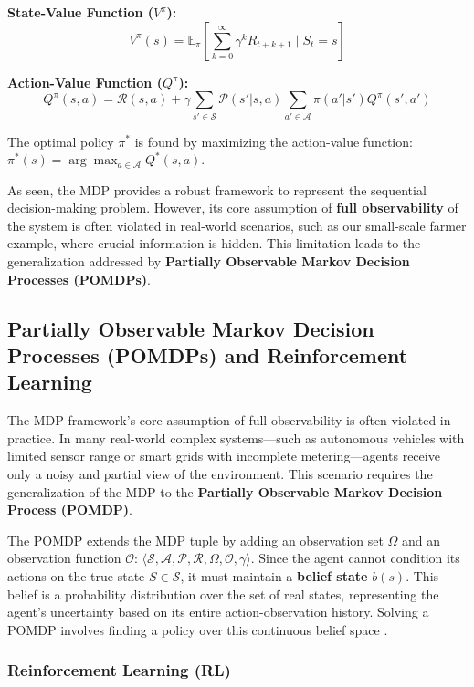 \documentclass[conference]{IEEEtran}
\begin{document}
\textbf{State-Value Function ($V^{\pi}$):}
$$V^{\pi}(s) = \mathbb{E}_{\pi} \left[ \sum_{k=0}^{\infty} \gamma^k R_{t+k+1} \mid S_t = s \right]$$

\textbf{Action-Value Function ($Q^{\pi}$):}
$$Q^{\pi}(s, a) = \mathcal{R}(s, a) + \gamma \sum_{s' \in \mathcal{S}} \mathcal{P}(s'|s, a) \sum_{a' \in \mathcal{A}} \pi(a'|s') Q^{\pi}(s', a')$$

\noindent The optimal policy $\pi^{*}$ is found by maximizing the action-value function: $\pi^{*}(s) = \arg \max_{a \in \mathcal{A}} Q^{*}(s, a)$.

\vspace{0.5em}
\noindent As seen, the MDP provides a robust framework to represent the sequential decision-making problem. However, its core assumption of \textbf{full observability} of the system is often violated in real-world scenarios, such as our small-scale farmer example, where crucial information is hidden. This limitation leads to the generalization addressed by \textbf{Partially Observable Markov Decision Processes (POMDPs)}.

\subsection{Partially Observable Markov Decision Processes (POMDPs) and Reinforcement Learning}

The MDP framework's core assumption of full observability is often violated in practice. In many real-world complex systems—such as autonomous vehicles with limited sensor range or smart grids with incomplete metering—agents receive only a noisy and partial view of the environment. This scenario requires the generalization of the MDP to the \textbf{Partially Observable Markov Decision Process (POMDP)}.

The POMDP extends the MDP tuple by adding an observation set $\Omega$ and an observation function $\mathcal{O}$: $\langle \mathcal{S}, \mathcal{A}, \mathcal{P}, \mathcal{R}, \Omega, \mathcal{O}, \gamma \rangle$. Since the agent cannot condition its actions on the true state $S \in \mathcal{S}$, it must maintain a \textbf{belief state} $b(s)$. This belief is a probability distribution over the set of real states, representing the agent's uncertainty based on its entire action-observation history. Solving a POMDP involves finding a policy over this continuous belief space \cite{kaelblingPlanningActingPartially1998}.

\subsubsection{Reinforcement Learning (RL)}
\end{document}
